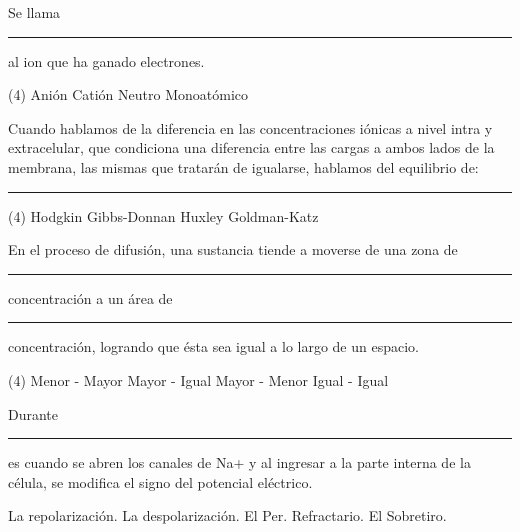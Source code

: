 \documentclass[12pt]{exam}
\begin{document}
\begin{questions}
    \question Se llama \rule{2cm}{0.1mm} al ion que ha ganado electrones.
    \begin{tasks}(4)
        \task Anión
        \task Catión
        \task Neutro
        \task Monoatómico        
    \end{tasks}
    \question Cuando hablamos de la diferencia en las concentraciones iónicas a nivel intra y extracelular, que condiciona una diferencia entre las cargas a ambos lados de la membrana, las mismas que tratarán de igualarse, hablamos del equilibrio de: \rule{2cm}{0.1mm}
    \begin{tasks}(4)
        \task Hodgkin
        \task Gibbs-Donnan
        \task Huxley
        \task Goldman-Katz
    \end{tasks}
    \question En el proceso de difusión, una sustancia tiende a moverse de una zona de \rule{2cm}{0.1mm} concentración a un área de \rule{2cm}{0.1mm} concentración, logrando que ésta sea igual a lo largo de un espacio.
    \begin{tasks}(4)
        \task Menor - Mayor
        \task Mayor - Igual
        \task Mayor - Menor
        \task Igual - Igual
    \end{tasks}
    \question Durante \rule{2cm}{0.1mm} es cuando se abren los canales de Na+ y al ingresar a la parte interna de la célula, se modifica el signo del potencial eléctrico.
    \begin{multicols}{2}
    \begin{tasks}
        \task La repolarización.
        \task La despolarización.
        \task El Per. Refractario.
        \task El Sobretiro.
    \end{tasks}
    \end{multicols}


\end{questions}
\end{document}
